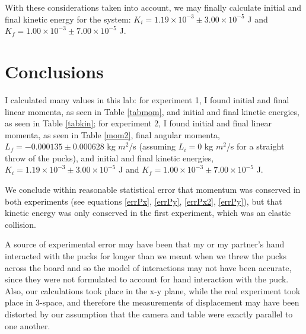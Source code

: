 \documentclass[11pt]{article}
\begin{document}
With these considerations taken into account, we may finally calculate initial and final kinetic energy for the system: $K_i = 1.19\times10^{-3} \pm3.00\times10^{-5}$ J and $K_f = 1.00\times10^{-3} \pm7.00\times10^{-5}$ J. 


\section{Conclusions}

I calculated many values in this lab: for experiment 1, I found initial and final linear momenta, as seen in Table \ref{tabmom}, and initial and final kinetic energies, as seen in Table \ref{tabkin}; for experiment 2, I found initial and final linear momenta, as seen in Table \ref{mom2}, final angular momenta, $L_f = -0.000135\pm 0.000628$ kg $m^2$/s (assuming $L_i=0$ kg $m^2$/s for a straight throw of the pucks), and initial and final kinetic energies, $K_i = 1.19\times10^{-3} \pm3.00\times10^{-5}$ J and $K_f = 1.00\times10^{-3} \pm7.00\times10^{-5}$ J. 


We conclude within reasonable statistical error that momentum was conserved in both experiments (see equations \ref{errPx}, \ref{errPy}, \ref{errPx2}, \ref{errPy}), but that kinetic energy was only conserved in the first experiment, which was an elastic collision.

A source of experimental error may have been that my or my partner's hand interacted with the pucks for longer than we meant when we threw the pucks across the board and so the model of interactions may not have been accurate, since they were not formulated to account for hand interaction with the puck. Also, our calculations took place in the x-y plane, while the real experiment took place in 3-space, and therefore the measurements of displacement may have been distorted by our assumption that the camera and table were exactly parallel to one another.



\end{document}
